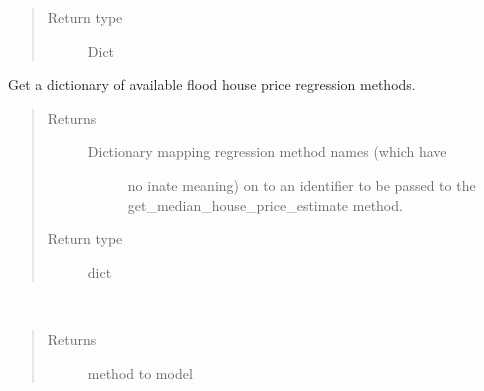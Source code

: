 \documentclass[letterpaper,10pt,english]{sphinxmanual}
\begin{document}
\begin{fulllineitems}
\begin{fulllineitems}
\begin{quote}
\begin{description}
\item[{Return type}] \leavevmode
\sphinxAtStartPar
Dict

\end{description}\end{quote}

\end{fulllineitems}


\begin{fulllineitems}
\label{\detokenize{index:flood_tool.Tool.get_house_price_methods}}
\sphinxAtStartPar
Get a dictionary of available flood house price regression methods.
\begin{quote}\begin{description}
\item[{Returns}] \leavevmode
\sphinxAtStartPar
\begin{description}
\item[{Dictionary mapping regression method names (which have}] \leavevmode
\sphinxAtStartPar
no inate meaning) on to an identifier to be passed to the
get\_median\_house\_price\_estimate method.

\end{description}


\item[{Return type}] \leavevmode
\sphinxAtStartPar
dict

\end{description}\end{quote}

\end{fulllineitems}


\begin{fulllineitems}
\label{\detokenize{index:flood_tool.Tool.get_house_price_models}}~\begin{quote}\begin{description}
\item[{Returns}] \leavevmode
\sphinxAtStartPar
method to model


\end{description}
\end{quote}
\end{fulllineitems}
\end{fulllineitems}
\end{document}
